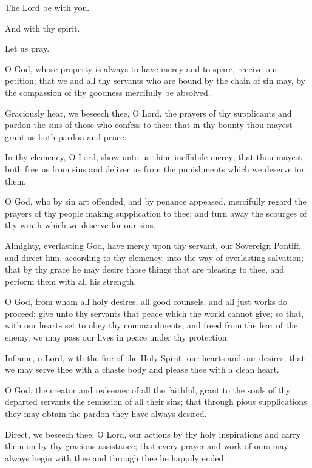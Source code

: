 {

\noindent	\vv The Lord be with you.
	
\noindent \rr And with thy spirit.


Let us pray.

\noindent O God, whose property is always to have mercy and to spare, receive our petition; that we and all thy servants who are bound by the chain of sin may, by the compassion of thy goodness mercifully be absolved.

\noindent Graciously hear, we beseech thee, O Lord, the prayers of thy supplicants and pardon the sins of those who confess to thee: that in thy bounty thou mayest grant us both pardon and peace.

\noindent In thy clemency, O Lord, show unto us thine ineffabile mercy; that thou mayest both free us from sins and deliver us from the punishments which we deserve for them.

\noindent O God, who by sin art offended, and by penance appeased, mercifully regard the prayers of thy people making supplication to thee; and turn away the scourges of thy wrath which we deserve for our sins.

\noindent Almighty, everlasting God, have mercy upon thy servant, \nomen{} our Sovereign Pontiff, and direct him, according to thy clemency, into the way of everlasting salvation; that by thy grace he may desire those things that are pleasing to thee, and perform them with all his strength.

\noindent O God, from whom all holy desires, all good counsels, and all just works do proceed; give unto thy servants that peace which the world cannot give; so that, with our hearts set to obey thy commandments, and freed from the fear of the enemy, we may pass our lives in peace under thy protection.

\noindent Inflame, o Lord, with the fire of the Holy Spirit, our hearts and our desires; that we may serve thee with a chaste body and please thee with a clean heart.

\noindent O God, the creator and redeemer of all the faithful, grant to the souls of thy departed servants the remission of all their sins; that through pious supplications they may obtain the pardon they have always desired.

\noindent Direct, we beseech thee, O Lord, our actions by thy holy inspirations and carry them on by thy gracious assistance; that every prayer and work of ours may always begin with thee and through thee be happily ended.

}
